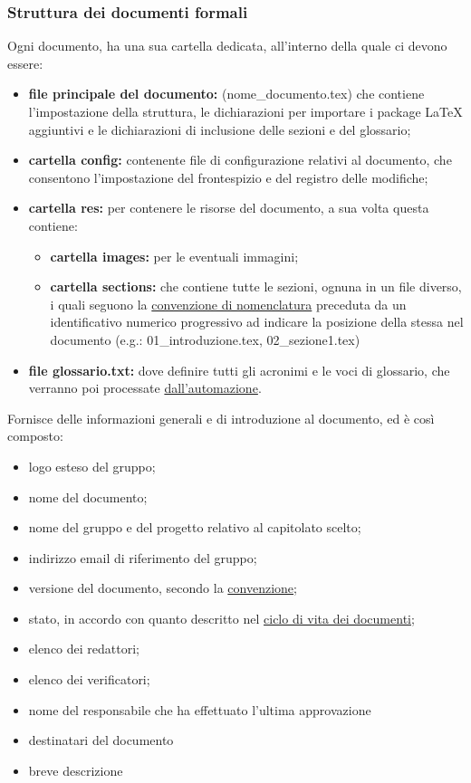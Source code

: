     \subsubsection{Struttura dei documenti formali}
    Ogni documento, ha una sua cartella dedicata, all'interno della quale ci devono essere:
    \begin{itemize}
        \item \textbf{file principale del documento: }(nome\_documento.tex) che contiene l'impostazione della struttura, le dichiarazioni per importare i package \LaTeX{} aggiuntivi e le dichiarazioni di inclusione delle sezioni e del glossario;
        \item \textbf{cartella config: }contenente file di configurazione relativi al documento, che consentono l'impostazione del frontespizio e del registro delle modifiche;
        \item \textbf{cartella res: }per contenere le risorse del documento, a sua volta questa contiene:
        \begin{itemize}
            \item \textbf{cartella images: }per le eventuali immagini;
            \item \textbf{cartella sections: }che contiene tutte le sezioni, ognuna in un file diverso, i quali seguono la \hyperref[convezionenomifile]{convenzione di nomenclatura} preceduta da un identificativo numerico progressivo ad indicare la posizione della stessa nel documento (e.g.: 01\_introduzione.tex, 02\_sezione1.tex)
        \end{itemize}
        \item \textbf{file glossario.txt: }dove definire tutti gli acronimi e le voci di glossario, che verranno poi processate \hyperref[glossario]{dall'automazione}.
    \end{itemize}
    Fornisce delle informazioni generali e di introduzione al documento, ed è così composto:
    \begin{itemize}
        \item logo esteso del gruppo;
        \item nome del documento;
        \item nome del gruppo e del progetto relativo al capitolato scelto;
        \item indirizzo email di riferimento del gruppo;
        \item versione del documento, secondo la \hyperref[versions]{convenzione};
        \item stato, in accordo con quanto descritto nel \hyperref[ciclovitadoc]{ciclo di vita dei documenti};
        \item elenco dei redattori;
        \item elenco dei verificatori;
        \item nome del responsabile che ha effettuato l'ultima approvazione
        \item destinatari del documento
        \item breve descrizione
    \end{itemize}
